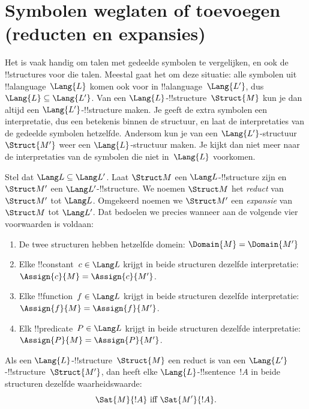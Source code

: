 \documentclass[../../../include/open-logic-section]{subfiles}
\begin{document}
\section{Symbolen weglaten of toevoegen (reducten en expansies)}

Het is vaak handig om talen met gedeelde symbolen te vergelijken, en
ook de !!{structure}s voor die talen. Meestal gaat het om deze
situatie: alle symbolen uit !!a{language}~$\Lang{L}$ komen ook voor in
!!a{language}~$\Lang{L'}$, dus $\Lang{L} \subseteq \Lang{L'}$. Van een
$\Lang{L}$-!!{structure}~$\Struct{M}$ kun je dan altijd een
$\Lang{L'}$-!!{structure} maken. Je geeft de extra symbolen een
interpretatie, dus een betekenis binnen de structuur, en laat de
interpretaties van de gedeelde symbolen hetzelfde. Andersom kun je van
een $\Lang{L'}$-structuur~$\Struct{M'}$ weer een
$\Lang{L}$-structuur maken. Je kijkt dan niet meer naar de
interpretaties van de symbolen die niet in~$\Lang{L}$ voorkomen.

\begin{defn}
Stel dat $\Lang L \subseteq \Lang L'$. Laat $\Struct M$ een
$\Lang L$-!!{structure} zijn en $\Struct M'$ een
$\Lang L'$-!!{structure}. We noemen $\Struct M$ het
\emph{reduct} van $\Struct M'$ tot $\Lang L$. Omgekeerd noemen we
$\Struct M'$ een \emph{expansie} van $\Struct M$ tot $\Lang L'$.
Dat bedoelen we precies wanneer aan de volgende vier voorwaarden is
voldaan:
\begin{enumerate}
\item De twee structuren hebben hetzelfde domein:
  $\Domain{M} = \Domain{M'}$
\item Elke !!{constant}~$c \in \Lang L$ krijgt in beide structuren
  dezelfde interpretatie: $\Assign{c}{M} =
  \Assign{c}{M'}$.
\item Elke !!{function}~$f \in \Lang L$ krijgt in beide structuren
  dezelfde interpretatie: $\Assign{f}{M} =
  \Assign{f}{M'}$.
\item Elk !!{predicate}~$P \in \Lang L$ krijgt in beide structuren
  dezelfde interpretatie: $\Assign{P}{M} =
  \Assign{P}{M'}$.
\end{enumerate}
\end{defn}

\begin{prop}
Als een $\Lang{L}$-!!{structure}~$\Struct{M}$ een reduct is van een
$\Lang{L'}$-!!{structure}~$\Struct{M'}$, dan heeft elke
$\Lang{L}$-!!{sentence}~$!A$ in beide structuren dezelfde
waarheidswaarde:
\[
\Sat{M}{!A} \text{ iff } \Sat{M'}{!A}.
\]
\end{prop}
\end{document}
